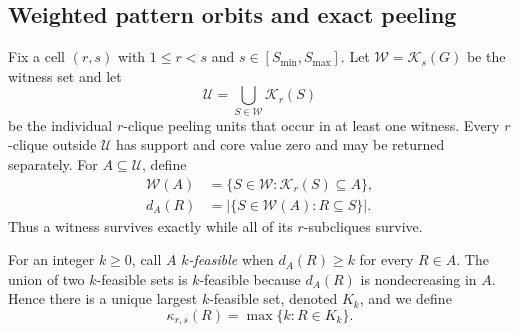 \subsection{Weighted pattern orbits and exact peeling}
\label{subsec:weighted-pattern-peeling}

Fix a cell $(r,s)$ with $1\leq r<s$ and $s\in[S_{\min},S_{\max}]$.
%
Let $\mathcal W=\mathcal K_s(G)$ be the witness set and let
\[
\mathcal U=\bigcup_{S\in\mathcal W}\mathcal K_r(S)
\]
be the individual $r$-clique peeling units that occur in at least one witness.
%
Every $r$-clique outside $\mathcal U$ has support and core value zero and may be returned separately.
%
For $A\subseteq\mathcal U$, define
\begin{equation}
\label{eq:induced-witness-support}
\begin{aligned}
\mathcal W(A)&=\{S\in\mathcal W:\mathcal K_r(S)\subseteq A\},\\
d_A(R)&=|\{S\in\mathcal W(A):R\subseteq S\}|.
\end{aligned}
\end{equation}
Thus a witness survives exactly while all of its $r$-subcliques survive.

For an integer $k\geq0$, call $A$ \emph{$k$-feasible} when $d_A(R)\geq k$ for every $R\in A$.
%
The union of two $k$-feasible sets is $k$-feasible because $d_A(R)$ is nondecreasing in $A$.
%
Hence there is a unique largest $k$-feasible set, denoted $K_k$, and we define
\begin{equation}
\label{eq:core-threshold-definition}
\kappa_{r,s}(R)=\max\{k:R\in K_k\}.
\end{equation}

